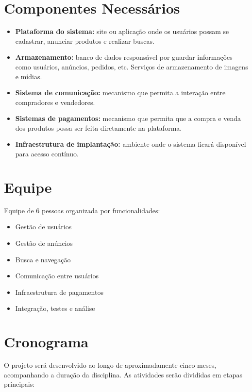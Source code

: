 \documentclass[a4paper,12pt]{article}
\begin{document}
\section{Componentes Necessários}

\begin{itemize}
    \item \textbf{Plataforma do sistema:} site ou aplicação onde os usuários possam se cadastrar, anunciar produtos e realizar buscas.

    \item \textbf{Armazenamento:} banco de dados responsável por guardar informações como usuários, anúncios, pedidos, etc. Serviços de armazenamento de imagens e mídias.

    \item \textbf{Sistema de comunicação:} mecanismo que permita a interação entre compradores e vendedores.

    \item \textbf{Sistemas de pagamentos:} mecanismo que permita que a compra e venda dos produtos possa ser feita diretamente na plataforma.

    \item \textbf{Infraestrutura de implantação:} ambiente onde o sistema ficará disponível para acesso contínuo.

\end{itemize}

\section{Equipe}
Equipe de 6 pessoas organizada por funcionalidades:
\begin{itemize}
    \item Gestão de usuários
    \item Gestão de anúncios
    \item Busca e navegação
    \item Comunicação entre usuários
    \item Infraestrutura de pagamentos
    \item Integração, testes e análise
\end{itemize}

\section{Cronograma}

O projeto será desenvolvido ao longo de aproximadamente cinco meses, acompanhando a duração da disciplina. As atividades serão divididas em etapas principais:
\end{document}

